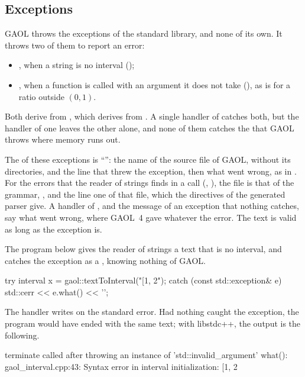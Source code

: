 \subsection{Exceptions}\label{sec:exceptions}
%
%

GAOL throws the exceptions of the standard library, and none of its
own.\newinvfive{} It throws two of them to report an error:
\begin{itemize}
\item {}, when a string is no interval
  ();
\item {}, when a function is called with an argument
  it does not take (), as  is for a
  ratio outside $(0, 1)$.
\end{itemize}

\noindent
Both derive from , which derives from
. A single handler of  catches
both, but the handler of one leaves the other alone, and none of them
catches the  that GAOL throws where memory runs out.

\medskip
The  of these exceptions is
``'': the name of the source file of GAOL,
without its directories, and the line that threw the exception, then what
went wrong, as in \code{gaol\_interval.cpp:43: Syntax error in interval
initialization: [1, 2}. For the errors that the reader of strings finds in a
call (, ), the file is that of the
grammar, , and the line one of that file,
which the directives  of the generated parser give. A handler
of , and the message of an exception that nothing
catches, say what went wrong, where GAOL~4 gave 
whatever the error. The text is valid as long as the exception is.

\begin{Ex}
The program below gives the reader of strings a text that is no interval,
and catches the exception as a , knowing nothing of
GAOL.
\begin{example}
try {
  interval x = gaol::textToInterval("[1, 2");
} catch (const std::exception& e) {
  std::cerr << e.what() << '\n';
}
\end{example}
The handler writes \code{gaol\_interval.cpp:43: Syntax error in interval
initialization: [1, 2} on the standard error. Had nothing caught the
exception, the program would have ended with the same text; with libstdc++,
the output is the following.
\begin{onscreen}
terminate called after throwing an instance of 'std::invalid_argument'
  what():  gaol_interval.cpp:43: Syntax error in interval initialization: [1, 2
\end{onscreen}
\end{Ex}

